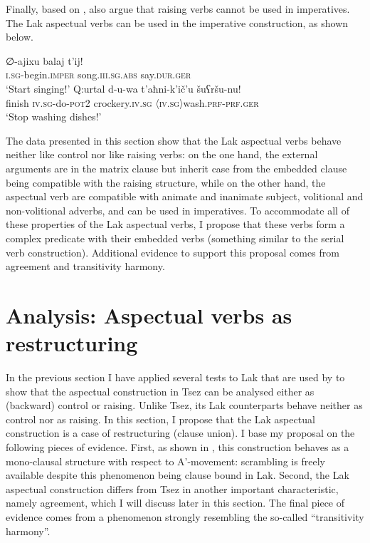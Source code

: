 \documentclass[output=paper]{langscibook}
\begin{document}
Finally, based on \citet{Farkas1988}, \cite{PolinskyPotsdam2002} also argue that raising verbs cannot be used in imperatives. The Lak aspectual verbs can be used in the imperative construction, as shown below.

\ea\label{Rad46}
\gll ∅-ajixu balaj t’ij!\\
\textsc{i.sg}-begin.\textsc{imper} song.\textsc{iii.sg.abs} say.\textsc{dur.ger}\\
\glt ‘Start singing!’
\ex\label{Rad47}
\gll Q:urtal d-u-wa t’aħni-k’ič’u šuʕršu-nu!\\
finish \textsc{iv.sg}-do-\textsc{pot2}	crockery.\textsc{iv.sg}	\textsc{〈iv.sg〉}wash.\textsc{prf-prf.ger}\\
\glt ‘Stop washing dishes!’
\z 

The data presented in this section show that the Lak aspectual verbs behave neither like control nor like raising verbs: on the one hand, the external arguments are in the matrix clause but inherit case from the embedded clause being compatible with the raising structure, while on the other hand, the aspectual verb are compatible with animate and inanimate subject, volitional and non-volitional adverbs, and can be used in imperatives. To accommodate all of these properties of the Lak aspectual verbs, I propose that these verbs form a complex predicate with their embedded verbs (something similar to the serial verb construction). Additional evidence to support this proposal comes from agreement and transitivity harmony.

\section{Analysis: Aspectual verbs as restructuring}\largerpage
In the previous section I have applied several tests to Lak that are used by \citet{PolinskyPotsdam2002} to show that the aspectual construction in Tsez can be analysed either as (backward) control or raising. Unlike Tsez, its Lak counterparts behave neither as control nor as raising. In this section, I propose that the Lak aspectual construction is a case of restructuring (clause union). I base my proposal on the following pieces of evidence. First, as shown in , this construction behaves as a mono-clausal structure with respect to A'-movement: scrambling is freely available despite this phenomenon being clause bound in Lak. Second, the Lak aspectual construction differs from Tsez in another important characteristic, namely agreement, which I will discuss later in this section. The final piece of evidence comes from a phenomenon strongly resembling the so-called ``transitivity harmony''.
\end{document}
